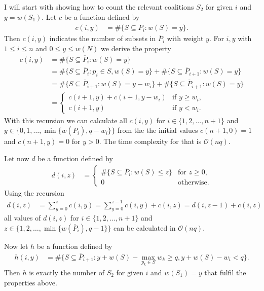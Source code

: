 \documentclass[review]{elsarticle}
\theoremstyle{defn}
\theoremstyle{Pseudo-Code}
\begin{document}
I will start with showing how to count the relevant coalitions $S_2$ for given $i$ and $y=w(S_1)$. 
Let $c$
be a function defined by
\begin{align*}  
   c(i,y)
   &=
   \#\{
     S\subseteq \overline{P}_i:
     w(S)=y
   \}.
  \end{align*}
  Then $c(i,y)$ indicates the number of subsets in $\overline{P}_i$ with weight $y$.
 For $i,y$ with $1\leq i\leq n$ and $0\leq y\leq w(N)$ we derive the property
  \begin{align*}
    c(i,y)
    &=
    \#\{
      S\subseteq \overline{P}_i:
      w(S)=y
    \}
\\
    &=
    \#\{
      S\subseteq \overline{P}_i:
      p_i \in S, w(S)=y
    \}    
    +
    \#\{
      S\subseteq \overline{P}_{i+1}:
      w(S)=y
    \} 
\\
    &=
    \#\{
      S\subseteq \overline{P}_{i+1}:
      w(S)=y-w_i
    \}    
    +
    \#\{
      S\subseteq \overline{P}_{i+1}:
      w(S)=y
    \}     
\\
    &=   
    \begin{cases}
      c(i+1,y)+c(i+1,y-w_i) & \text{if } y\geq w_i, \\
      c(i+1,y) & \text{if } y<w_i.
    \end{cases}
  \end{align*}
  With this recursion we can calculate all $c(i,y)$ for $i\in\{1,2,\dots,n+1\}$ and $y\in\{0,1,\dots,\min\{w(\overline{P}_i),q-w_i\}\}$ from the the initial values $c(n+1,0)=1$ and $c(n+1,y)=0$ for $y>0$.
  The time complexity for that is $\mathcal{O}(nq)$.

Let now $d$ be a function defined by
    \begin{align*}
  d(i,z)
  &=
     \begin{cases}
     \#
     \{
       S\subseteq \overline{P}_i:
       w(S)\leq z
     \} & \text{for } z \geq 0, \\
     0 & \text{otherwise.}
   \end{cases}
  \end{align*}
Using the recursion
\begin{align*}
   d(i,z)
   &=
   \sum_{y=0}^z c(i,y)
=
    \sum_{y=0}^{z-1}c(i,y) + c(i,z) 
    =
     d(i,z-1) + c(i,z)
\end{align*}
all values of $d(i,z)$ for $i\in\{1,2,\dots,n+1\}$ and $z\in\{1,2,\dots,\min\{w(\overline{P}_i), q-1\}\}$ can be calculated  in $\mathcal{O}(nq)$.

Now let $h$ be a function defined by
\begin{align*}    
    h(i,y)
    &=
     \#\{
       S\subseteq \overline{P}_{i+1}: 
       y+w(S)-\max\limits_{p_k\in S}w_k \geq q, 
	   y+w(S)-w_i<q
     \}.
  \end{align*}
Then $h$ is exactly the number of $S_2$ for given $i$ and $w(S_1)=y$ that fulfil the properties above.
\end{document}
